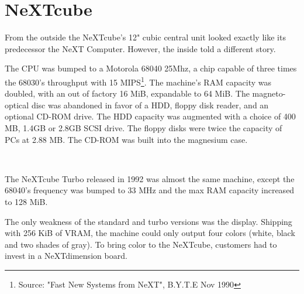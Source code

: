 
\section{NeXTcube}
From the outside the NeXTcube's 12" cubic central unit looked exactly like its predecessor the NeXT Computer. However, the inside told a different story.\\
\par
 The CPU was bumped to a Motorola 68040 25Mhz, a chip capable of three times the 68030's throughput with 15 MIPS\footnote{Source: "Fast New Systems from NeXT", B.Y.T.E Nov 1990}. The machine's RAM capacity was doubled, with an out of factory 16 MiB, expandable to 64 MiB. The magneto-optical disc was abandoned in favor of a HDD, floppy disk reader, and an optional CD-ROM drive. The HDD capacity was augmented with a choice of 400 MB, 1.4GB or 2.8GB SCSI drive. The floppy disks were twice the capacity of PCs at 2.88 MB. The CD-ROM was built into the magnesium case.\\
\par
\begin{minipage}{\textwidth}
 \\
\end{minipage}

\par
The NeXTcube Turbo released in 1992 was almost the same machine, except the 68040's frequency was bumped to 33 MHz and the max RAM capacity increased to 128 MiB.\\
\par
The only weakness of the standard and turbo versions was the display. Shipping with 256 KiB of VRAM, the machine could only output four colors (white, black and two shades of gray). To bring color to the NeXTcube, customers had to invest in a NeXTdimension board.\\
\par

\pagebreak



